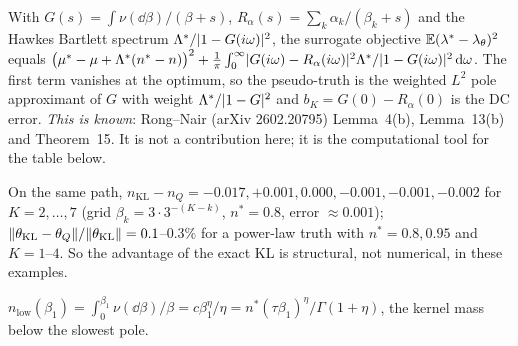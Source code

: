 \begin{proposition}\label{prop:m-freq}\Pt{}
With $G(s)=\int\nu(\dd\beta)/(\beta+s)$, $R_\alpha(s)=\sum_k\alpha_k/(\beta_k+s)$ and the Hawkes Bartlett spectrum $\Lambda^*/\lvert 1-G(i\omega)\rvert^2$, the surrogate objective $\mathbb{E}(\lambda^*-\lambda_\theta)^2$ equals $\big(\mu^*-\mu+\Lambda^*(n^*-n)\big)^2+\frac1\pi\int_0^\infty\lvert G(i\omega)-R_\alpha(i\omega)\rvert^2\Lambda^*/\lvert 1-G(i\omega)\rvert^2\,\mathrm d\omega$. The first term vanishes at the optimum, so the pseudo-truth is the weighted $L^2$ pole approximant of $G$ with weight $\Lambda^*/\lvert 1-G\rvert^2$ and $b_K=G(0)-R_\alpha(0)$ is the DC error. \emph{This is known}: Rong--Nair (arXiv 2602.20795) Lemma~4(b), Lemma~13(b) and Theorem~15. It is not a contribution here; it is the computational tool for the table below.
\end{proposition}

\begin{proposition}\label{prop:m-klq}\Nt{}
On the same path, $n_{\mathrm{KL}}-n_Q=-0.017,+0.001,0.000,-0.001,-0.001,-0.002$ for $K=2,\dots,7$ (grid $\beta_k=3\cdot3^{-(K-k)}$, $n^*=0.8$, error $\approx0.001$); $\lVert \theta_{\mathrm{KL}}-\theta_Q\rVert/\lVert \theta_{\mathrm{KL}}\rVert=0.1$--$0.3\%$ for a power-law truth with $n^*=0.8,0.95$ and $K=1$--$4$. So the advantage of the exact KL is structural, not numerical, in these examples.
\end{proposition}

\begin{definition}
$n_{\mathrm{low}}(\beta_1)=\int_0^{\beta_1}\nu(\dd\beta)/\beta=c\beta_1^\eta/\eta=n^*(\tau\beta_1)^\eta/\Gamma(1+\eta)$, the kernel mass below the slowest pole.
\end{definition}

